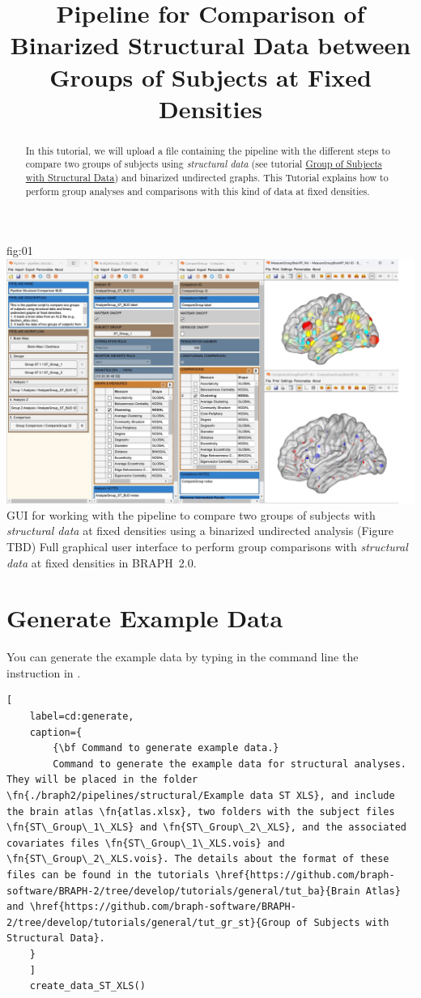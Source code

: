 \documentclass[justified]{tufte-handout}
\title[Comparison of Structural Data using BUT]{Pipeline for Comparison of Binarized Structural Data between Groups of Subjects at Fixed Densities}
\begin{document}
\maketitle

\begin{abstract}
\noindent
In this tutorial, we will upload a file containing the pipeline with the different steps to compare two groups of subjects using \emph{structural data} (see tutorial \href{https://github.com/braph-software/BRAPH-2/tree/develop/tutorials/general/tut_gr_st}{Group of Subjects with Structural Data}) and binarized undirected graphs. This Tutorial explains how to perform group analyses and comparisons with this kind of data at fixed densities.
\end{abstract}

\tableofcontents

	{fig:01}
	{\includegraphics{fig01.jpg}}
	{GUI for working with the pipeline to compare two groups of subjects with \emph{structural data} at fixed densities using a binarized undirected analysis (Figure TBD)}
	{
	Full graphical user interface to perform group comparisons with \emph{structural data} at fixed densities in BRAPH~2.0. 
	}

\clearpage

\section{Generate Example Data}

You can generate the example data by typing in the command line the instruction in .
%
\begin{lstlisting}[
	label=cd:generate,
	caption={
		{\bf Command to generate example data.}
		Command to generate the example data for structural analyses. They will be placed in the folder \fn{./braph2/pipelines/structural/Example data ST XLS}, and include the brain atlas \fn{atlas.xlsx}, two folders with the subject files \fn{ST\_Group\_1\_XLS} and \fn{ST\_Group\_2\_XLS}, and the associated covariates files \fn{ST\_Group\_1\_XLS.vois} and \fn{ST\_Group\_2\_XLS.vois}. The details about the format of these files can be found in the tutorials \href{https://github.com/braph-software/BRAPH-2/tree/develop/tutorials/general/tut_ba}{Brain Atlas} and \href{https://github.com/braph-software/BRAPH-2/tree/develop/tutorials/general/tut_gr_st}{Group of Subjects with Structural Data}.
	}
	]
	create_data_ST_XLS()
\end{lstlisting}
\end{document}
